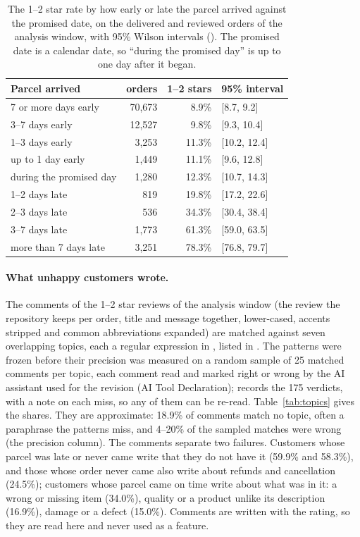 \begin{table}[htbp]
\centering
\caption{The 1--2 star rate by how early or late the parcel arrived against the
promised date, on the delivered and reviewed orders of the analysis window, with
95\% Wilson intervals (). The promised date is
a calendar date, so ``during the promised day'' is up to one day after it began.}
\label{tab:lateday}
\footnotesize
\begin{tabular}{@{}lrrl@{}}
\toprule
\textbf{Parcel arrived} & \textbf{orders} & \textbf{1--2 stars} & \textbf{95\% interval} \\
\midrule
7 or more days early & 70{,}673 & 8.9\% & [8.7, 9.2] \\
3--7 days early & 12{,}527 & 9.8\% & [9.3, 10.4] \\
1--3 days early & 3{,}253 & 11.3\% & [10.2, 12.4] \\
up to 1 day early & 1{,}449 & 11.1\% & [9.6, 12.8] \\
during the promised day & 1{,}280 & 12.3\% & [10.7, 14.3] \\
1--2 days late & 819 & 19.8\% & [17.2, 22.6] \\
2--3 days late & 536 & 34.3\% & [30.4, 38.4] \\
3--7 days late & 1{,}773 & 61.3\% & [59.0, 63.5] \\
more than 7 days late & 3{,}251 & 78.3\% & [76.8, 79.7] \\
\bottomrule
\end{tabular}
\end{table}

\paragraph{What unhappy customers wrote.} The comments of the 1--2 star reviews
of the analysis window (the review the repository keeps per order, title and
message together, lower-cased, accents stripped and common abbreviations
expanded) are matched against seven overlapping topics, each a regular
expression in , listed in
. The patterns were frozen before their
precision was measured on a random sample of 25 matched comments per topic, each
comment read and marked right or wrong by the AI assistant used for the revision
(AI Tool Declaration);  records the 175
verdicts, with a note on each miss, so any of them can be re-read. Table~\ref{tab:topics} gives the
shares. They are approximate: 18.9\% of comments match no topic, often a
paraphrase the patterns miss, and 4--20\% of the sampled matches were wrong
(the precision column). The comments separate two failures. Customers whose
parcel was late or never came write that they do not have it (59.9\% and 58.3\%),
and those whose order never came also write about refunds and cancellation
(24.5\%); customers whose parcel came on time write about what was in it: a wrong
or missing item (34.0\%), quality or a product unlike its description (16.9\%),
damage or a defect (15.0\%). Comments are written with the rating, so they are
read here and never used as a feature.


